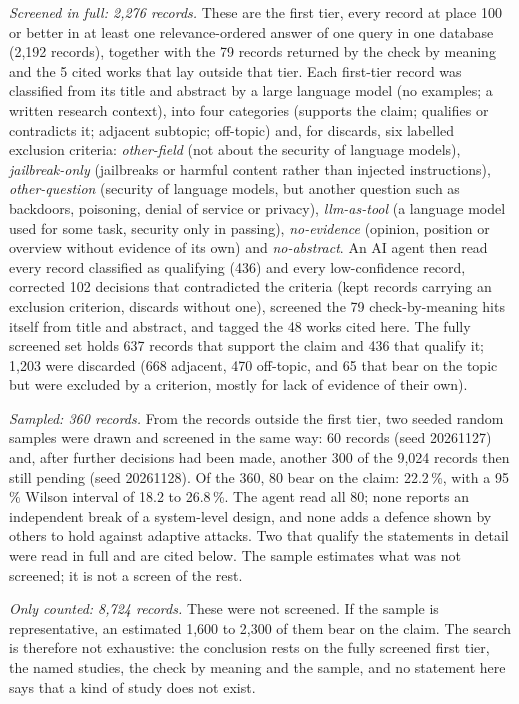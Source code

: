 \emph{Screened in full: 2,276 records.} These are the first tier, every
record at place 100 or better in at least one relevance-ordered answer of
one query in one database (2,192 records), together with the 79 records
returned by the check by meaning and the 5 cited works that lay outside
that tier. Each first-tier record was classified from its title and
abstract by a large language model (no examples; a written research
context), into four categories (supports the claim; qualifies or
contradicts it; adjacent subtopic; off-topic) and, for discards, six
labelled exclusion criteria: \emph{other-field} (not about the security of
language models), \emph{jailbreak-only} (jailbreaks or harmful content
rather than injected instructions), \emph{other-question} (security of
language models, but another question such as backdoors, poisoning,
denial of service or privacy), \emph{llm-as-tool} (a language model used
for some task, security only in passing), \emph{no-evidence} (opinion,
position or overview without evidence of its own) and \emph{no-abstract}.
An AI agent then read every record classified as qualifying (436) and
every low-confidence record, corrected 102 decisions that contradicted the
criteria (kept records carrying an exclusion criterion, discards without
one), screened the 79 check-by-meaning hits itself from title and
abstract, and tagged the 48 works cited here. The fully screened set holds
637 records that support the claim and 436 that qualify it; 1,203 were
discarded (668 adjacent, 470 off-topic, and 65 that bear on the topic but
were excluded by a criterion, mostly for lack of evidence of their own).

\emph{Sampled: 360 records.} From the records outside the first tier, two
seeded random samples were drawn and screened in the same way: 60 records
(seed 20261127) and, after further decisions had been made, another 300 of
the 9,024 records then still pending (seed 20261128). Of the 360, 80 bear
on the claim: 22.2\,\%, with a 95\,\% Wilson interval of 18.2 to 26.8\,\%.
The agent read all 80; none reports an independent break of a
system-level design, and none adds a defence shown by others to hold
against adaptive attacks. Two that qualify the statements in detail were
read in full and are cited below. The sample estimates what was not
screened; it is not a screen of the rest.

\emph{Only counted: 8,724 records.} These were not screened. If the
sample is representative, an estimated 1,600 to 2,300 of them bear on the
claim. The search is therefore not exhaustive: the conclusion rests on the
fully screened first tier, the named studies, the check by meaning and the
sample, and no statement here says that a kind of study does not exist.

